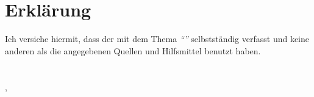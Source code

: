
\chapter*{Erklärung}

Ich versiche hiermit, dass der {\documentTypePhrase} mit dem Thema \textit{"`\documentTitle"'} selbstständig verfasst und keine anderen als die angegebenen Quellen und Hilfsmittel benutzt haben.\\
\\
\documentAuthor\\
\releaseLocation, \releaseDate
